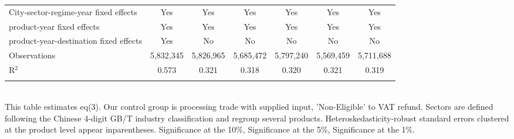 \documentclass[preview]{standalone}
\begin{document}
\begin{table}[!htbp]
\begin{adjustbox}{width=\textwidth, totalheight=\baselineskip,keepaspectratio}
\begin{tabular}{@{\extracolsep{5pt}}lcccccc}
City-sector-regime-year fixed effects & Yes & Yes & Yes & Yes & Yes & Yes \\ 
product-year fixed effects & Yes & Yes & Yes & Yes & Yes & Yes \\ 
product-year-destination fixed effects & Yes & No & No & No & No & No \\ 
Observations & 5,832,345 & 5,826,965 & 5,685,472 & 5,797,240 & 5,569,459 & 5,711,688 \\ 
R$^{2}$ & 0.573 & 0.321 & 0.318 & 0.320 & 0.321 & 0.319 \\ 
\hline 
\hline \\[-1.8ex] 
\end{tabular}
\end{adjustbox}
\begin{tablenotes} 
 \small 
 \item \\ 

This table estimates eq(3). 
Our control group is processing trade with supplied input, 'Non-Eligible' to VAT refund.
Sectors are defined following the Chinese 4-digit GB/T industry
classification and regroup several products.
Heteroskedasticity-robust standard errors
clustered at the product level appear inparentheses.
\sym{*} Significance at the 10\%, \sym{**} Significance at the 5\%, \sym{***} Significance at the 1\%. 
\end{tablenotes}
\end{table}
\end{document}
